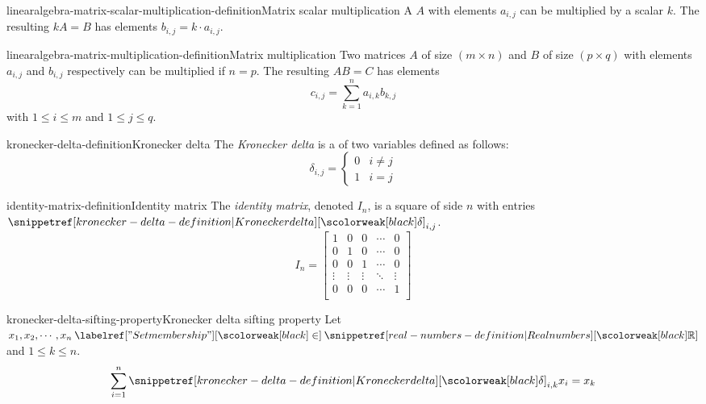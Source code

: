 \documentclass[preview]{standalone}
\begin{document}
\begin{snippetdefinition}{linearalgebra-matrix-scalar-multiplication-definition}{Matrix scalar multiplication}
    A \matrix \(A\) with elements \(a_{i,j}\)
    can be multiplied by a scalar \(k\).
    The resulting \matrix \(kA=B\) has elements
    \(b_{i,j} = k \cdot a_{i,j}\).
\end{snippetdefinition}

\begin{snippetdefinition}{linearalgebra-matrix-multiplication-definition}{Matrix multiplication}
    Two matrices \(A\) of size \((m \times n)\) and
    \(B\) of size \((p \times q)\)
    with elements \(a_{i,j}\) and \(b_{i,j}\) respectively
    can be multiplied if \(n=p\).
    The resulting \matrix \(AB=C\) has elements
    \[
        c_{i,j} = \sum_{k=1}^n
        a_{i,k}b_{k,j}
    \]
    with \(1 \leq i \leq m\)
    and \(1 \leq j \leq q\).
\end{snippetdefinition}

\begin{snippetdefinition}{kronecker-delta-definition}{Kronecker delta}
    The \emph{Kronecker delta} is a \function of two variables
    defined as follows:
    \[
        \delta_{i,j} = \begin{cases}
            0 & i \neq j \\
            1 & i = j
        \end{cases}
    \]
\end{snippetdefinition}

\begin{snippetdefinition}{identity-matrix-definition}{Identity matrix}
    The \textit{identity matrix}, denoted \(I_n\),
    is a square \matrix of side \(n\)
    with entries \(\kronecker_{i,j}\).
    \[
    I_n=
        \begin{bmatrix}
            1 & 0 & 0 & \cdots & 0 \\
            0 & 1 & 0 & \cdots & 0 \\
            0 & 0 & 1 & \cdots & 0 \\
            \vdots & \vdots & \vdots & \ddots & \vdots \\
            0 & 0 & 0 & \cdots & 1 \\
        \end{bmatrix}
    \]
\end{snippetdefinition}

\begin{snippetproposition}{kronecker-delta-sifting-property}{Kronecker delta sifting property}
    Let \(x_1, x_2, \cdots, x_n \in \realnumbers\)
    and \(1 \leq k \leq n\).
    \[
        \sum_{i=1}^n \kronecker_{i,k}x_i = x_k
    \]
\end{snippetproposition}
\end{document}
